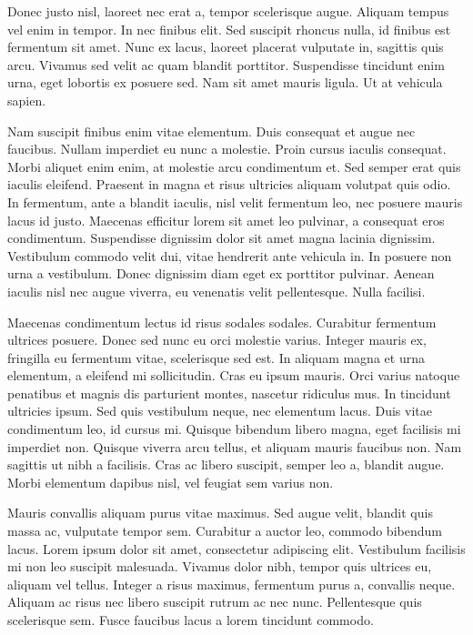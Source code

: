 Donec justo nisl, laoreet nec erat a, tempor scelerisque augue. Aliquam tempus vel enim in tempor. In nec finibus elit. Sed suscipit rhoncus nulla, id finibus est fermentum sit amet. Nunc ex lacus, laoreet placerat vulputate in, sagittis quis arcu. Vivamus sed velit ac quam blandit porttitor. Suspendisse tincidunt enim urna, eget lobortis ex posuere sed. Nam sit amet mauris ligula. Ut at vehicula sapien.

Nam suscipit finibus enim vitae elementum. Duis consequat et augue nec faucibus. Nullam imperdiet eu nunc a molestie. Proin cursus iaculis consequat. Morbi aliquet enim enim, at molestie arcu condimentum et. Sed semper erat quis iaculis eleifend. Praesent in magna et risus ultricies aliquam volutpat quis odio. In fermentum, ante a blandit iaculis, nisl velit fermentum leo, nec posuere mauris lacus id justo. Maecenas efficitur lorem sit amet leo pulvinar, a consequat eros condimentum. Suspendisse dignissim dolor sit amet magna lacinia dignissim. Vestibulum commodo velit dui, vitae hendrerit ante vehicula in. In posuere non urna a vestibulum. Donec dignissim diam eget ex porttitor pulvinar. Aenean iaculis nisl nec augue viverra, eu venenatis velit pellentesque. Nulla facilisi.

Maecenas condimentum lectus id risus sodales sodales. Curabitur fermentum ultrices posuere. Donec sed nunc eu orci molestie varius. Integer mauris ex, fringilla eu fermentum vitae, scelerisque sed est. In aliquam magna et urna elementum, a eleifend mi sollicitudin. Cras eu ipsum mauris. Orci varius natoque penatibus et magnis dis parturient montes, nascetur ridiculus mus. In tincidunt ultricies ipsum. Sed quis vestibulum neque, nec elementum lacus. Duis vitae condimentum leo, id cursus mi. Quisque bibendum libero magna, eget facilisis mi imperdiet non. Quisque viverra arcu tellus, et aliquam mauris faucibus non. Nam sagittis ut nibh a facilisis. Cras ac libero suscipit, semper leo a, blandit augue. Morbi elementum dapibus nisl, vel feugiat sem varius non.

Mauris convallis aliquam purus vitae maximus. Sed augue velit, blandit quis massa ac, vulputate tempor sem. Curabitur a auctor leo, commodo bibendum lacus. Lorem ipsum dolor sit amet, consectetur adipiscing elit. Vestibulum facilisis mi non leo suscipit malesuada. Vivamus dolor nibh, tempor quis ultrices eu, aliquam vel tellus. Integer a risus maximus, fermentum purus a, convallis neque. Aliquam ac risus nec libero suscipit rutrum ac nec nunc. Pellentesque quis scelerisque sem. Fusce faucibus lacus a lorem tincidunt commodo.

